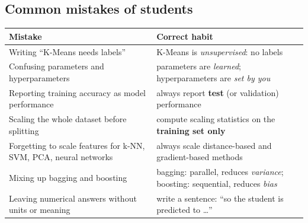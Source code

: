 \subsection*{Common mistakes of students}

\begin{center}
\small
\begin{tabular}{@{}p{6.4cm}p{6.9cm}@{}}
\toprule
\textbf{Mistake} & \textbf{Correct habit}\\
\midrule
Writing ``K-Means needs labels'' & K-Means is \emph{unsupervised}: no labels\\
Confusing parameters and hyperparameters & parameters are \emph{learned}; hyperparameters are \emph{set by you}\\
Reporting training accuracy as model performance & always report \textbf{test} (or validation) performance\\
Scaling the whole dataset before splitting & compute scaling statistics on the \textbf{training set only}\\
Forgetting to scale features for k-NN, SVM, PCA, neural networks & always scale distance-based and gradient-based methods\\
Mixing up bagging and boosting & bagging: parallel, reduces \emph{variance}; boosting: sequential, reduces \emph{bias}\\
Leaving numerical answers without units or meaning & write a sentence: ``so the student is predicted to \dots''\\
\bottomrule
\end{tabular}
\end{center}
